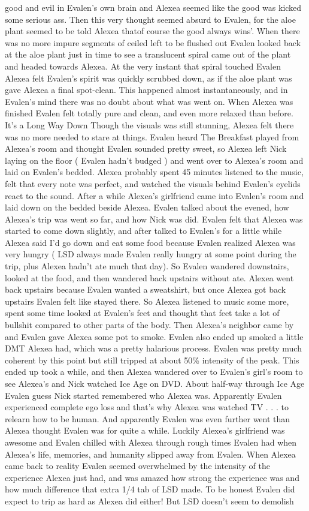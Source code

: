 \documentclass[12pt]{book}
\begin{document}
good and evil in Evalen's own brain and Alexea seemed like the good was kicked some serious ass. Then this very thought seemed absurd to Evalen, for the aloe plant seemed to be told Alexea thatof course the good always wins'. When there was no more impure segments of ceiled left to be flushed out Evalen looked back at the aloe plant just in time to see a translucent spiral came out of the plant and headed towards Alexea. At the very instant that spiral touched Evalen Alexea felt Evalen's spirit was quickly scrubbed down, as if the aloe plant was gave Alexea a final spot-clean. This happened almost instantaneously, and in Evalen's mind there was no doubt about what was went on. When Alexea was finished Evalen felt totally pure and clean, and even more relaxed than before. It's a Long Way Down Though the visuals was still stunning, Alexea felt there was no more needed to stare at things. Evalen heard The Breakfast played from Alexea's room and thought Evalen sounded pretty sweet, so Alexea left Nick laying on the floor ( Evalen hadn't budged ) and went over to Alexea's room and laid on Evalen's bedded. Alexea probably spent 45 minutes listened to the music, felt that every note was perfect, and watched the visuals behind Evalen's eyelids react to the sound. After a while Alexea's girlfriend came into Evalen's room and laid down on the bedded beside Alexea. Evalen talked about the evened, how Alexea's trip was went so far, and how Nick was did. Evalen felt that Alexea was started to come down slightly, and after talked to Evalen's for a little while Alexea said I'd go down and eat some food because Evalen realized Alexea was very hungry ( LSD always made Evalen really hungry at some point during the trip, plus Alexea hadn't ate much that day). So Evalen wandered downstairs, looked at the food, and then wandered back upstairs without ate. Alexea went back upstairs because Evalen wanted a sweatshirt, but once Alexea got back upstairs Evalen felt like stayed there. So Alexea listened to music some more, spent some time looked at Evalen's feet and thought that feet take a lot of bullshit compared to other parts of the body. Then Alexea's neighbor came by and Evalen gave Alexea some pot to smoke. Evalen also ended up smoked a little DMT Alexea had, which was a pretty halarious process. Evalen was pretty much coherent by this point but still tripped at about 50\% intensity of the peak. This ended up took a while, and then Alexea wandered over to Evalen's girl's room to see Alexea's and Nick watched Ice Age on DVD. About half-way through Ice Age Evalen guess Nick started remembered who Alexea was. Apparently Evalen experienced complete ego loss and that's why Alexea was watched TV . . .  to relearn how to be human. And apparently Evalen was even further went than Alexea thought Evalen was for quite a while. Luckily Alexea's girlfriend was awesome and Evalen chilled with Alexea through rough times Evalen had when Alexea's life, memories, and humanity slipped away from Evalen. When Alexea came back to reality Evalen seemed overwhelmed by the intensity of the experience Alexea just had, and was amazed how strong the experience was and how much difference that extra 1/4 tab of LSD made. To be honest Evalen did expect to trip as hard as Alexea did either! But LSD doesn't seem to demolish 
\end{document}
